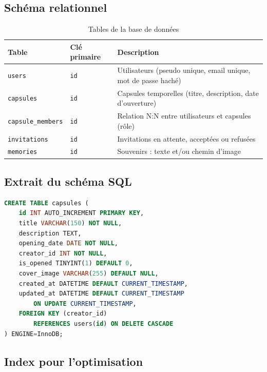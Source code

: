 \documentclass[12pt,a4paper]{report}
\begin{document}
\subsection{Schéma relationnel}

\begin{table}[H]
    \centering
    \begin{tabularx}{\textwidth}{l l X}
        \toprule
        \textbf{Table} & \textbf{Clé primaire} & \textbf{Description} \\
        \midrule
        \texttt{users} & \texttt{id} & Utilisateurs (pseudo unique, email unique, mot de passe haché) \\
        \texttt{capsules} & \texttt{id} & Capsules temporelles (titre, description, date d'ouverture) \\
        \texttt{capsule\_members} & \texttt{id} & Relation N:N entre utilisateurs et capsules (rôle) \\
        \texttt{invitations} & \texttt{id} & Invitations en attente, acceptées ou refusées \\
        \texttt{memories} & \texttt{id} & Souvenirs : texte et/ou chemin d'image \\
        \bottomrule
    \end{tabularx}
    \caption{Tables de la base de données}
\end{table}

\subsection{Extrait du schéma SQL}

\begin{lstlisting}[language=SQL, caption={Création de la table capsules}]
CREATE TABLE capsules (
    id INT AUTO_INCREMENT PRIMARY KEY,
    title VARCHAR(150) NOT NULL,
    description TEXT,
    opening_date DATE NOT NULL,
    creator_id INT NOT NULL,
    is_opened TINYINT(1) DEFAULT 0,
    cover_image VARCHAR(255) DEFAULT NULL,
    created_at DATETIME DEFAULT CURRENT_TIMESTAMP,
    updated_at DATETIME DEFAULT CURRENT_TIMESTAMP
        ON UPDATE CURRENT_TIMESTAMP,
    FOREIGN KEY (creator_id)
        REFERENCES users(id) ON DELETE CASCADE
) ENGINE=InnoDB;
\end{lstlisting}

\subsection{Index pour l'optimisation}
\end{document}
